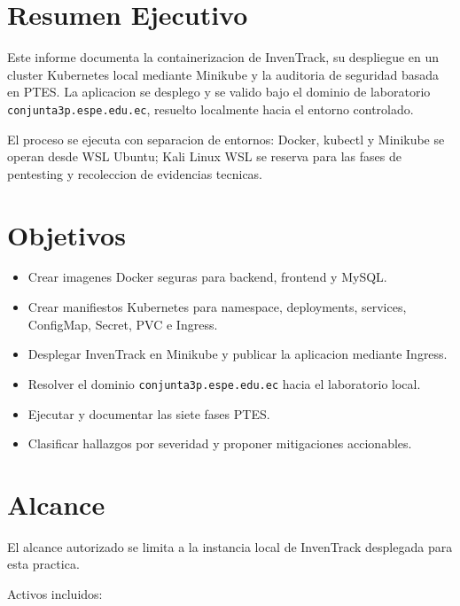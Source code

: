 \section{Resumen Ejecutivo}\label{resumen-ejecutivo}

Este informe documenta la containerizacion de InvenTrack, su despliegue en un cluster Kubernetes local mediante Minikube y la auditoria de seguridad basada en PTES. La aplicacion se desplego y se valido bajo el dominio de laboratorio \texttt{conjunta3p.espe.edu.ec}, resuelto localmente hacia el entorno controlado.

El proceso se ejecuta con separacion de entornos: Docker, kubectl y Minikube se operan desde WSL Ubuntu; Kali Linux WSL se reserva para las fases de pentesting y recoleccion de evidencias tecnicas.

\section{Objetivos}\label{objetivos}

\begin{itemize}
\tightlist
\item
  Crear imagenes Docker seguras para backend, frontend y MySQL.
\item
  Crear manifiestos Kubernetes para namespace, deployments, services, ConfigMap, Secret, PVC e Ingress.
\item
  Desplegar InvenTrack en Minikube y publicar la aplicacion mediante Ingress.
\item
  Resolver el dominio \texttt{conjunta3p.espe.edu.ec} hacia el laboratorio local.
\item
  Ejecutar y documentar las siete fases PTES.
\item
  Clasificar hallazgos por severidad y proponer mitigaciones accionables.
\end{itemize}

\section{Alcance}\label{alcance}

El alcance autorizado se limita a la instancia local de InvenTrack desplegada para esta practica.

Activos incluidos:

